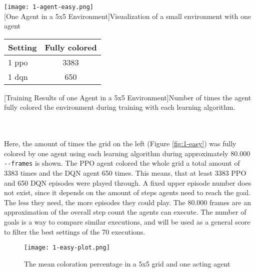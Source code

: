 \begin{minipage}{\textwidth}
  \begin{minipage}[b]{0.29\textwidth}
    \centering
    \texttt{[image: 1-agent-easy.png]}\\
    [One Agent in a 5x5 Environment]{Visualization of a small environment with one agent}\label{fig:1-easy}
  \end{minipage}
  \hfill
  \begin{minipage}[b]{0.69\textwidth}
    \centering
    \begin{tabular}{lc}\hline
      Setting & Fully colored \\ \hline
        1 ppo & 3383 \\
        1 dqn & 650 \\ \hline
      \end{tabular}
      [Training Results of one Agent in a 5x5 Environment]{Number of times the agent fully colored the environment during training with each learning algorithm. \\}\label{t:1-easy}
    \end{minipage}
  \end{minipage}\\\\

Here, the amount of times the grid on the left (Figure \ref{fig:1-easy}) was fully colored by one agent using each learning algorithm during approximately 80.000 \verb|--frames| is shown. The PPO agent colored the whole grid a total amount of 3383 times and the DQN agent 650 times. This means, that at least 3383 PPO and 650 DQN episodes were played through. A fixed upper episode number does not exist, since it depends on the amount of steps agents need to reach the goal. The less they need, the more episodes they could play. The 80.000 frames are an approximation of the overall step count the agents can execute. The number of goals is a way to compare similar executions, and will be used as a general score to filter the best settings of the 70 executions.

\begin{figure}[hpbt]
    \centering
    \texttt{[image: 1-easy-plot.png]}\\
    \caption[Mean Coloration Percentage of one Agent in a 5x5 Environment]{The mean coloration percentage in a 5x5 grid and one acting agent}\label{fig:1-easy-plot}
\end{figure}

